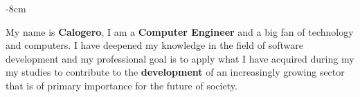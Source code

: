 \documentclass[10pt,a4paper]{altacv}
\begin{document}







\begin{adjustwidth}{}{-8cm}
\makecvheader
\end{adjustwidth}

My name is \textbf{Calogero}, I am a \textbf{Computer Engineer} and a big fan of technology and computers. I have deepened my knowledge in the field of software development and my professional goal is to apply what I have acquired during my
my studies to contribute to the \textbf{development} of an increasingly growing sector that is of
primary importance for the future of society.


\end{document}
